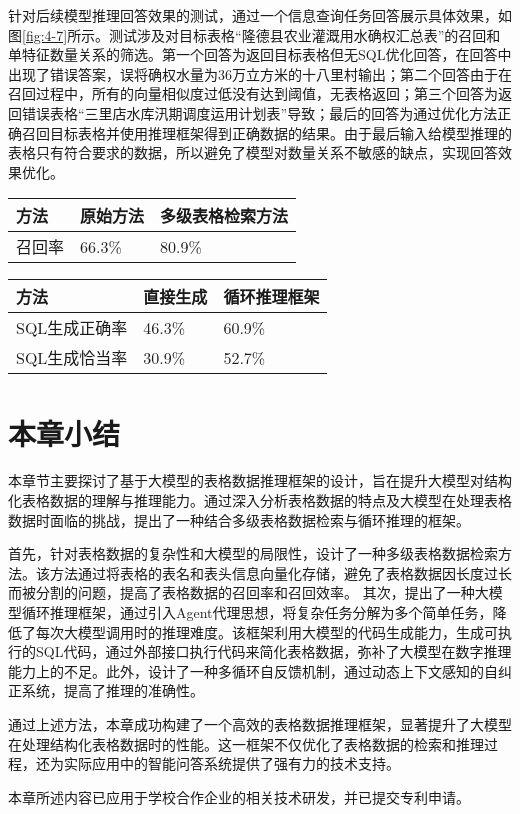 针对后续模型推理回答效果的测试，通过一个信息查询任务回答展示具体效果，如图\ref{fig:4-7}所示。测试涉及对目标表格“隆德县农业灌溉用水确权汇总表”的召回和单特征数量关系的筛选。第一个回答为返回目标表格但无SQL优化回答，在回答中出现了错误答案，误将确权水量为36万立方米的十八里村输出；第二个回答由于在召回过程中，所有的向量相似度过低没有达到阈值，无表格返回；第三个回答为返回错误表格“三里店水库汛期调度运用计划表”导致；最后的回答为通过优化方法正确召回目标表格并使用推理框架得到正确数据的结果。由于最后输入给模型推理的表格只有符合要求的数据，所以避免了模型对数量关系不敏感的缺点，实现回答效果优化。
\begin{table}[h]
    \centering
    \label{tab:table-retrival-results}
    \begin{tabularx}{\linewidth}{XXX}
        \toprule[1.5pt]
        {方法} & {原始方法} & {多级表格检索方法} \\
        \midrule[1pt]
        {召回率} & 66.3\% & 80.9\% \\
        \bottomrule[1.5pt]
    \end{tabularx}
\end{table}
\begin{table}[h]
    \centering
    \label{tab:SQL-Generation-results}
    \begin{tabularx}{\linewidth}{XXX}
        \toprule[1.5pt]
        {方法} & {直接生成} & {循环推理框架} \\
        \midrule[1pt]
        {SQL生成正确率} & 46.3\% & 60.9\% \\
        {SQL生成恰当率} & 30.9\% & 52.7\% \\
        \bottomrule[1.5pt]
    \end{tabularx}
\end{table}
\section{本章小结}
本章节主要探讨了基于大模型的表格数据推理框架的设计，旨在提升大模型对结构化表格数据的理解与推理能力。通过深入分析表格数据的特点及大模型在处理表格数据时面临的挑战，提出了一种结合多级表格数据检索与循环推理的框架。

首先，针对表格数据的复杂性和大模型的局限性，设计了一种多级表格数据检索方法。该方法通过将表格的表名和表头信息向量化存储，避免了表格数据因长度过长而被分割的问题，提高了表格数据的召回率和召回效率。
其次，提出了一种大模型循环推理框架，通过引入Agent代理思想，将复杂任务分解为多个简单任务，降低了每次大模型调用时的推理难度。该框架利用大模型的代码生成能力，生成可执行的SQL代码，通过外部接口执行代码来简化表格数据，弥补了大模型在数字推理能力上的不足。此外，设计了一种多循环自反馈机制，通过动态上下文感知的自纠正系统，提高了推理的准确性。

通过上述方法，本章成功构建了一个高效的表格数据推理框架，显著提升了大模型在处理结构化表格数据时的性能。这一框架不仅优化了表格数据的检索和推理过程，还为实际应用中的智能问答系统提供了强有力的技术支持。

本章所述内容已应用于学校合作企业的相关技术研发，并已提交专利申请。
